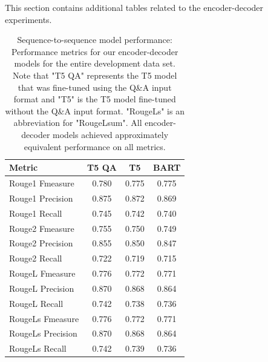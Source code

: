\documentclass[11pt]{article}
\begin{document}
This section contains additional tables related to the encoder-decoder experiments.

\begin{table}[hbt!]
\begin{tabular}{l c c c}
\hline
\textbf{Metric} & \textbf{T5 QA} & \textbf{T5} & \textbf{BART}\\
\hline
Rouge1 Fmeasure & 0.780 & 0.775 & 0.775\\
\phantom{X}Rouge1 Precision & 0.875 & 0.872 & 0.869\\
\phantom{X}Rouge1 Recall & 0.745 & 0.742 & 0.740\\
Rouge2 Fmeasure & 0.755 & 0.750 & 0.749\\
\phantom{X}Rouge2 Precision & 0.855 & 0.850 & 0.847\\
\phantom{X}Rouge2 Recall & 0.722 & 0.719 & 0.715\\
RougeL Fmeasure & 0.776 & 0.772 & 0.771\\
\phantom{X}RougeL Precision & 0.870 & 0.868 & 0.864\\
\phantom{X}RougeL Recall & 0.742 & 0.738 & 0.736\\
RougeLs Fmeasure & 0.776 & 0.772 & 0.771\\
\phantom{X}RougeLs Precision & 0.870 & 0.868 & 0.864\\
\phantom{X}RougeLs Recall & 0.742 & 0.739 & 0.736\\
\hline
\end{tabular}

\caption{Sequence-to-sequence model performance: Performance metrics for our encoder-decoder models for the entire development data set. Note that "T5 QA" represents the T5 model that was fine-tuned using the Q\&A input format and "T5" is the T5 model fine-tuned without the Q\&A input format. "RougeLs" is an abbreviation for "RougeLsum". All encoder-decoder models achieved approximately equivalent performance on all metrics.}
\label{tab appendix seq2seq: general}
\end{table}
\end{document}
